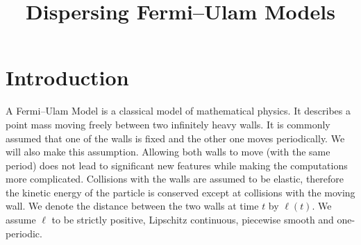 \documentclass[AHL, Unicode, longabstracts,published]{cedram}
\title{Dispersing Fermi--Ulam Models}
\author[\initial{J.} \lastname{De Simoi}]{\firstname{Jacopo} \lastname{De Simoi}}
\author[\initial{D.} \lastname{Dolgopyat}]{\firstname{Dmitry} \lastname{Dolgopyat}}
\begin{document}
\maketitle

\tableofcontents
\section{Introduction}
A Fermi--Ulam Model is a classical model of mathematical physics. It describes a point mass moving freely between two infinitely heavy walls. It is commonly assumed that one of the walls is fixed and the other one moves periodically. We will also make this assumption. Allowing both walls to move (with the same period) does not lead to significant new features while making the computations more complicated. Collisions with the walls are assumed to be elastic, therefore the kinetic energy of the particle is conserved except at collisions with the moving wall. We denote the distance between the two walls at time $t$ by $\ell(t)$. We assume $\ell$ to be strictly positive, Lipschitz continuous, piecewise smooth and one-periodic.
\end{document}
